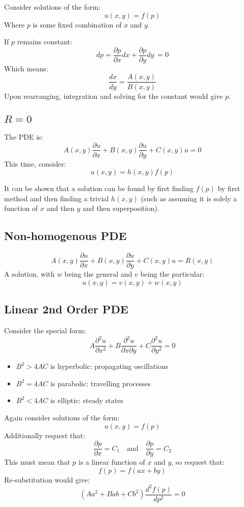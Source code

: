 \documentclass[12pt]{article}
\begin{document}
Consider solutions of the form:
\[ u(x,y) = f(p)\]
Where $p$ is some fixed combination of $x$ and $y$.

If $p$ remains constant:
\[ dp =\frac{\partial p}{\partial x} dx + \frac{\partial p}{\partial y} dy\ = 0\]
Which means:
\[\frac{dx}{dy} =\frac{A(x,y)}{B(x,y)}\]
Upon rearranging, integration and solving for the constant would give $p$.

\subsection{$R=0$}
The PDE is:
\[ A(x,y)\frac{\partial u}{\partial x} + B(x,y)\frac{\partial u}{\partial y} +C(x,y)u=0\]
This time, consider:
\[u(x,y) = h(x,y)f(p)\]

It can be shown that a solution can be found by first finding $f(p)$ by first method and then finding a trivial $h(x,y)$ (such as assuming it is solely a function of $x$ and then $y$ and then superposition).

\subsection{Non-homogenous PDE}
\[ A(x,y)\frac{\partial u}{\partial x} + B(x,y)\frac{\partial u}{\partial y} +C(x,y)u=R(x,y)\]
A solution, with $w$ being the general and $v$ being the particular:
\[u(x,y) = v(x,y)+w(x,y)\]

\subsection{Linear 2nd Order PDE}
Consider the special form:
\[A\frac{\partial^2u}{\partial x^2} + B\frac{\partial^2u}{\partial x \partial y} + C\frac{\partial^2 u}{\partial y^2} = 0\]

\begin{itemize}
    \item $B^2 > 4AC$ is hyperbolic: propagating oscillations
    \item $B^2 = 4AC$ is parabolic: travelling processes
    \item $B^2 < 4AC$ is elliptic: steady states
\end{itemize}
Again consider solutions of the form:
\[u(x,y) = f(p)\]
Additionally request that:
\[\frac{\partial p}{\partial x} = C_1 \quad\text{and}\quad \frac{\partial p}{\partial y} = C_2\]
This must mean that $p$ is a linear function of $x$ and $y$, so request that:
\[f(p)=f(ax+by)\]
Re-substitution would give:
\[(Aa^2+Bab +Cb^2)\frac{d^2f(p)}{dp^2} = 0\]
\end{document}
